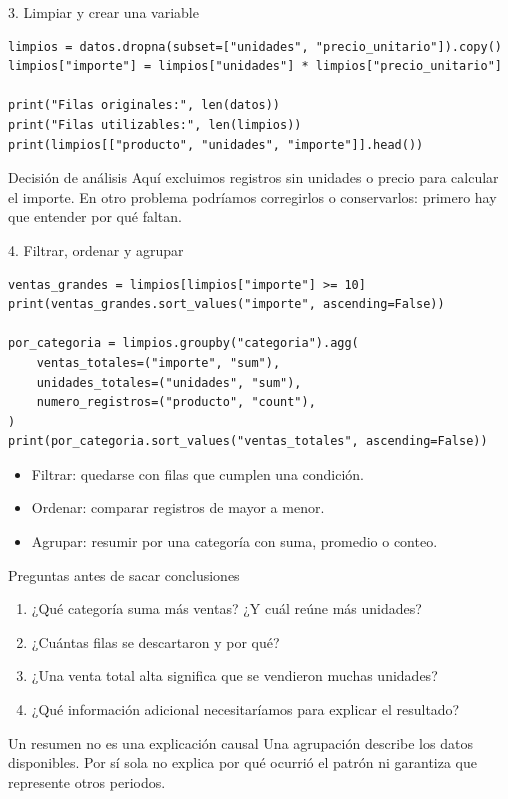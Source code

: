 \documentclass[aspectratio=169,11pt]{beamer}
\begin{document}
\begin{frame}[fragile]{3. Limpiar y crear una variable}
  \begin{lstlisting}[style=codigo]
limpios = datos.dropna(subset=["unidades", "precio_unitario"]).copy()
limpios["importe"] = limpios["unidades"] * limpios["precio_unitario"]

print("Filas originales:", len(datos))
print("Filas utilizables:", len(limpios))
print(limpios[["producto", "unidades", "importe"]].head())
  \end{lstlisting}
  \begin{block}{Decisión de análisis}
    Aquí excluimos registros sin unidades o precio para calcular el importe. En otro problema podríamos corregirlos o conservarlos: primero hay que entender por qué faltan.
  \end{block}
\end{frame}

\begin{frame}[fragile]{4. Filtrar, ordenar y agrupar}
  \begin{lstlisting}[style=codigo]
ventas_grandes = limpios[limpios["importe"] >= 10]
print(ventas_grandes.sort_values("importe", ascending=False))

por_categoria = limpios.groupby("categoria").agg(
    ventas_totales=("importe", "sum"),
    unidades_totales=("unidades", "sum"),
    numero_registros=("producto", "count"),
)
print(por_categoria.sort_values("ventas_totales", ascending=False))
  \end{lstlisting}
  \begin{itemize}
    \item Filtrar: quedarse con filas que cumplen una condición.
    \item Ordenar: comparar registros de mayor a menor.
    \item Agrupar: resumir por una categoría con suma, promedio o conteo.
  \end{itemize}
\end{frame}

\begin{frame}{Preguntas antes de sacar conclusiones}
  \begin{enumerate}
    \item ¿Qué categoría suma más ventas? ¿Y cuál reúne más unidades?
    \item ¿Cuántas filas se descartaron y por qué?
    \item ¿Una venta total alta significa que se vendieron muchas unidades?
    \item ¿Qué información adicional necesitaríamos para explicar el resultado?
  \end{enumerate}
  \begin{alertblock}{Un resumen no es una explicación causal}
    Una agrupación describe los datos disponibles. Por sí sola no explica por qué ocurrió el patrón ni garantiza que represente otros periodos.
  \end{alertblock}
\end{frame}
\end{document}
